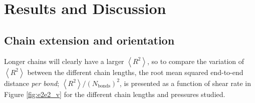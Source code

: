 \documentclass[aps,prb,reprint,superscriptaddress, a4paper]{revtex4-1}
\begin{document}

\section{Results and Discussion}

\subsection{Chain extension and orientation}

Longer chains will clearly have a larger $\left< R^2 \right> $, so to compare the variation of $\left< R^2 \right> $ between the different chain lengths, the root mean squared end-to-end distance \emph{per bond}; $\left< R^2 \right>/\left(N_\text{bonds}\right)^2$, is presented as a function of shear rate in Figure \ref{fig:e2e2_v} for the different chain lengths and pressures studied.
\end{document}
